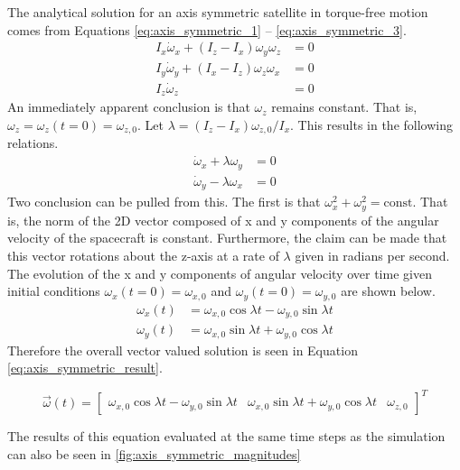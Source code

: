 The analytical solution for an axis symmetric satellite in torque-free motion comes from Equations \ref{eq:axis_symmetric_1} -- \ref{eq:axis_symmetric_3}.
\begin{eqnarray}
    I_x \dot{\omega}_x + (I_z - I_x) \omega_y \omega_z &= 0 \label{eq:axis_symmetric_1}\\
    I_y \dot{\omega}_y + (I_x - I_z) \omega_z \omega_x &= 0 \label{eq:axis_symmetric_2}\\
    I_z \dot{\omega}_z &= 0 \label{eq:axis_symmetric_3}
\end{eqnarray}
An immediately apparent conclusion is that $\omega_z$ remains constant. That is, $\omega_z = \omega_z(t = 0) = \omega_{z,0}$. Let $\lambda = (I_z - I_x) \omega_{z,0}/ I_x$. This results in the following relations.
\begin{eqnarray*}
    \dot{\omega}_x + \lambda \omega_y &= 0 \\
    \dot{\omega}_y - \lambda \omega_x &= 0
\end{eqnarray*}
Two conclusion can be pulled from this. The first is that $\omega_x^2 + \omega_y^2 = \text{const}$. That is, the norm of the 2D vector composed of x and y components of the angular velocity of the spacecraft is constant. Furthermore, the claim can be made that this vector rotations about the z-axis at a rate of $\lambda$ given in radians per second. The evolution of the x and y components of angular velocity over time given initial conditions $\omega_x (t = 0) = \omega_{x,0}$ and $\omega_y (t = 0) = \omega_{y,0}$ are shown below.
\begin{eqnarray*}
    \omega_x(t) &= \omega_{x,0} \cos{\lambda t} - \omega_{y,0} \sin{\lambda t} \\
    \omega_y(t) &= \omega_{x,0} \sin{\lambda t} + \omega_{y,0} \cos{\lambda t}
\end{eqnarray*}
Therefore the overall vector valued solution is seen in Equation \ref{eq:axis_symmetric_result}.

\begin{equation} \label{eq:axis_symmetric_result}
    \vec{\omega}(t) = \begin{bmatrix}
        \omega_{x,0} \cos{\lambda t} - \omega_{y,0} \sin{\lambda t} &
        \omega_{x,0} \sin{\lambda t} + \omega_{y,0} \cos{\lambda t} & \omega_{z,0}
    \end{bmatrix}^T
\end{equation}

The results of this equation evaluated at the same time steps as the simulation can also be seen in \ref{fig:axis_symmetric_magnitudes}

